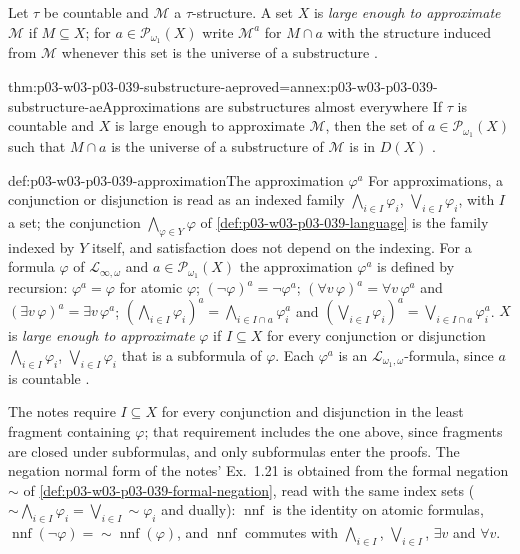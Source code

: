 Let \(\tau\) be countable and \(\mathcal M\) a \(\tau\)-structure. A set \(X\)
is \emph{large enough to approximate} \(\mathcal M\) if \(M\subseteq X\); for
\(a\in\mathcal P_{\omega_1}(X)\) write \(\mathcal M^a\) for \(M\cap a\) with
the structure induced from \(\mathcal M\) whenever this set is the universe
of a substructure \cite[pp.~23--24]{Marker2014InfinitaryNotes}.

\begin{hblemma}{thm:p03-w03-p03-039-substructure-ae}{proved=annex:p03-w03-p03-039-substructure-ae}{Approximations are substructures almost everywhere}
If \(\tau\) is countable and \(X\) is large enough to approximate
\(\mathcal M\), then the set of \(a\in\mathcal P_{\omega_1}(X)\) such that
\(M\cap a\) is the universe of a substructure of \(\mathcal M\) is in
\(D(X)\) \cite[Ex.~2.40, p.~24]{Marker2014InfinitaryNotes}.
\end{hblemma}

\begin{hbdefinition}{def:p03-w03-p03-039-approximation}{The approximation \(\varphi^a\)}
For approximations, a conjunction or disjunction is read as an indexed family
\(\bigwedge_{i\in I}\varphi_i\), \(\bigvee_{i\in I}\varphi_i\), with \(I\) a
set; the conjunction \(\bigwedge_{\varphi\in Y}\varphi\) of
\cref{def:p03-w03-p03-039-language} is the family indexed by \(Y\) itself,
and satisfaction does not depend on the indexing. For a formula \(\varphi\)
of \(\mathcal L_{\infty,\omega}\) and \(a\in\mathcal P_{\omega_1}(X)\) the
approximation \(\varphi^a\) is defined by recursion: \(\varphi^a=\varphi\)
for atomic \(\varphi\); \((\neg\varphi)^a=\neg\varphi^a\);
\((\forall v\,\varphi)^a=\forall v\,\varphi^a\) and
\((\exists v\,\varphi)^a=\exists v\,\varphi^a\);
\((\bigwedge_{i\in I}\varphi_i)^a=\bigwedge_{i\in I\cap a}\varphi_i^a\) and
\((\bigvee_{i\in I}\varphi_i)^a=\bigvee_{i\in I\cap a}\varphi_i^a\).
\(X\) is \emph{large enough to approximate} \(\varphi\) if \(I\subseteq X\)
for every conjunction or disjunction \(\bigwedge_{i\in I}\varphi_i\),
\(\bigvee_{i\in I}\varphi_i\) that is a subformula of \(\varphi\). Each
\(\varphi^a\) is an \(\mathcal L_{\omega_1,\omega}\)-formula, since \(a\) is
countable \cite[Def.~2.41, p.~24]{Marker2014InfinitaryNotes}.
\end{hbdefinition}

The notes require \(I\subseteq X\) for every conjunction and disjunction in
the least fragment containing \(\varphi\); that requirement includes the one
above, since fragments are closed under subformulas, and only subformulas
enter the proofs. The negation normal form of the notes' Ex.~1.21 is
obtained from the formal negation \({\sim}\) of
\cref{def:p03-w03-p03-039-formal-negation}, read with the same index sets
(\({\sim}\bigwedge_{i\in I}\varphi_i=\bigvee_{i\in I}{\sim}\varphi_i\) and
dually): \(\operatorname{nnf}\) is the identity on atomic formulas,
\(\operatorname{nnf}(\neg\varphi)={\sim}\operatorname{nnf}(\varphi)\), and
\(\operatorname{nnf}\) commutes with \(\bigwedge_{i\in I}\),
\(\bigvee_{i\in I}\), \(\exists v\) and \(\forall v\).

